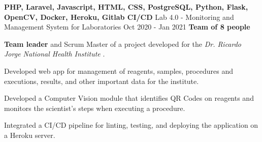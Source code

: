   \cventry
    {\textbf{PHP, Laravel, Javascript, HTML, CSS, PostgreSQL, Python, Flask, OpenCV, Docker, Heroku, Gitlab CI/CD}} %
    {Lab 4.0 - Monitoring and Management System for Laboratories \href{https://laboratorio-4.herokuapp.com/}{\faExternalLink}} %
    {Oct 2020 - Jan 2021} %
    {\textbf{Team of 8 people}} %
    {
      \begin{cvitems} %
        \item {\textbf{Team leader} and Scrum Master of a project developed for the \textit{Dr. Ricardo Jorge National Health Institute} \href{http://www.insa.pt}{\faExternalLink}.}
        \item {Developed web app for management of reagents, samples, procedures and executions, results, and other important data for the institute.}
        \item {Developed a Computer Vision module that identifies QR Codes on reagents and monitors the scientist's steps when executing a procedure.}
        \item {Integrated a CI/CD pipeline for linting, testing, and deploying the application on a Heroku server.}
      \end{cvitems}
    }